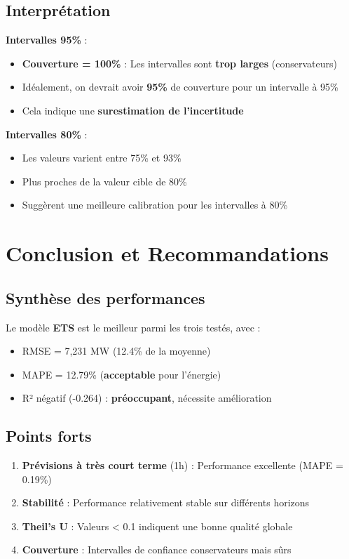 \documentclass[12pt,a4paper]{article}
\begin{document}
\subsection{Interprétation}

\textbf{Intervalles 95\%} :
\begin{itemize}
    \item \textbf{Couverture = 100\%} : Les intervalles sont \textbf{trop larges} (conservateurs)
    \item Idéalement, on devrait avoir \textbf{95\%} de couverture pour un intervalle à 95\%
    \item Cela indique une \textbf{surestimation de l'incertitude}
\end{itemize}

\textbf{Intervalles 80\%} :
\begin{itemize}
    \item Les valeurs varient entre 75\% et 93\%
    \item Plus proches de la valeur cible de 80\%
    \item Suggèrent une meilleure calibration pour les intervalles à 80\%
\end{itemize}

\section{Conclusion et Recommandations}

\subsection{Synthèse des performances}

Le modèle \textbf{ETS} est le meilleur parmi les trois testés, avec :
\begin{itemize}
    \item RMSE = 7,231 MW (12.4\% de la moyenne)
    \item MAPE = 12.79\% (\textbf{acceptable} pour l'énergie)
    \item R² négatif (-0.264) : \textbf{préoccupant}, nécessite amélioration
\end{itemize}

\subsection{Points forts}

\begin{enumerate}
    \item \textbf{Prévisions à très court terme} (1h) : Performance excellente (MAPE = 0.19\%)
    \item \textbf{Stabilité} : Performance relativement stable sur différents horizons
    \item \textbf{Theil's U} : Valeurs < 0.1 indiquent une bonne qualité globale
    \item \textbf{Couverture} : Intervalles de confiance conservateurs mais sûrs
\end{enumerate}
\end{document}

